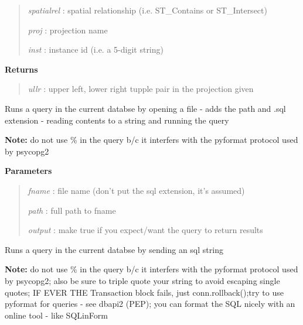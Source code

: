 \documentclass[letterpaper,10pt,english]{sphinxmanual}
\begin{document}
\begin{fulllineitems}
\begin{fulllineitems}
\begin{quote}
\emph{spatialrel} : spatial relationship (i.e. ST\_Contains or ST\_Intersect)

\emph{proj}       : projection name

\emph{inst}       : instance id (i.e. a 5-digit string)
\end{quote}

\textbf{Returns}
\begin{quote}

\emph{ullr}       : upper left, lower right tupple pair in the projection given
\end{quote}

\end{fulllineitems}


\begin{fulllineitems}
\label{code:Database.Database.qryFromFile}
Runs a query in the current databse by opening a file - adds the path and 
.sql extension - reading contents to a string and running the query

\textbf{Note:} do not use \% in the query b/c it interfers with the pyformat protocol
used by psycopg2

\textbf{Parameters}
\begin{quote}

\emph{fname}  : file name (don't put the sql extension, it's assumed)

\emph{path}   : full path to fname

\emph{output} : make true if you expect/want the query to return results
\end{quote}

\end{fulllineitems}


\begin{fulllineitems}
\label{code:Database.Database.qryFromText}
Runs a query in the current databse by sending an sql string

\textbf{Note:} do not use \% in the query b/c it interfers with the pyformat protocol
used by psycopg2; also be sure to triple quote your string to avoid escaping single quotes;
IF EVER THE Transaction block fails, just conn.rollback();try to use pyformat for queries - see dbapi2 (PEP);
you can format the SQL nicely with an online tool - like SQLinForm


\end{fulllineitems}
\end{fulllineitems}
\end{document}
